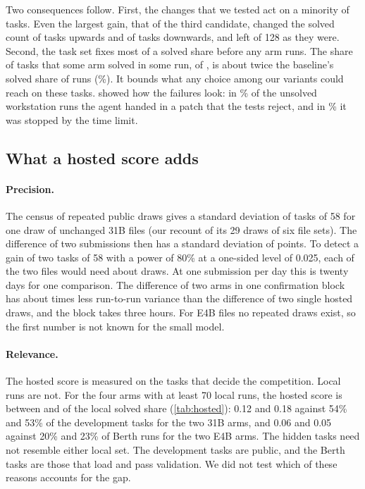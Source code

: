 Two consequences follow. First, the changes that we tested act on a minority of tasks. Even the largest gain,
that of the third candidate, changed the solved count of \CandThreeTasksUp{} tasks upwards and of \CandThreeTasksDown{}
tasks downwards, and left \CandThreeTasksSame{} of 128 as they were. Second, the task set fixes most of a solved share before any arm
runs. The share of tasks that some arm solved in some run, \WsTasksSolvedAny{} of \WsTasksAny{}, is about twice the
baseline's solved share of runs (\BaseWsPct\%). It bounds what any choice among our variants could reach on these
tasks.  showed how the failures look: in \WsUnsolvedWrongPct\% of the unsolved workstation runs the
agent handed in a patch that the tests reject, and in \WsUnsolvedTimeoutPct\% it was stopped by the time limit.

\subsection{What a hosted score adds}\label{sec:hostednoise}

\paragraph{Precision.}
The census of repeated public draws gives a standard deviation of \HostedSdTasks{} tasks of 58 for one draw of
unchanged 31B files (our recount of its 29 draws of six file sets). The difference of two submissions then has a
standard deviation of \HostedSdDiffPts{} points. To detect a gain of two tasks of 58 with a power of 80\% at a
one-sided level of 0.025, each of the two files would need about \HostedDrawsNeeded{} draws. At one submission per
day this is twenty days for one comparison. The difference of two arms in one confirmation block has about
\LocalBlockRatio{} times less run-to-run variance than the difference of two single hosted draws, and the block takes
three hours. For E4B files no repeated draws exist, so the first number is not known for the small model.

\paragraph{Relevance.}
The hosted score is measured on the tasks that decide the competition. Local runs are not. For the four arms with at
least 70 local runs, the hosted score is between \HostedRatioMin{} and \HostedRatioMax{} of the local solved share
(\cref{tab:hosted}): 0.12 and 0.18 against 54\% and 53\% of the development tasks for the two 31B arms, and 0.06
and 0.05 against 20\% and 23\% of Berth runs for the two E4B arms. The hidden tasks need not resemble either local
set. The development tasks are public, and the Berth tasks are those that load and pass validation. We did not test
which of these reasons accounts for the gap.


